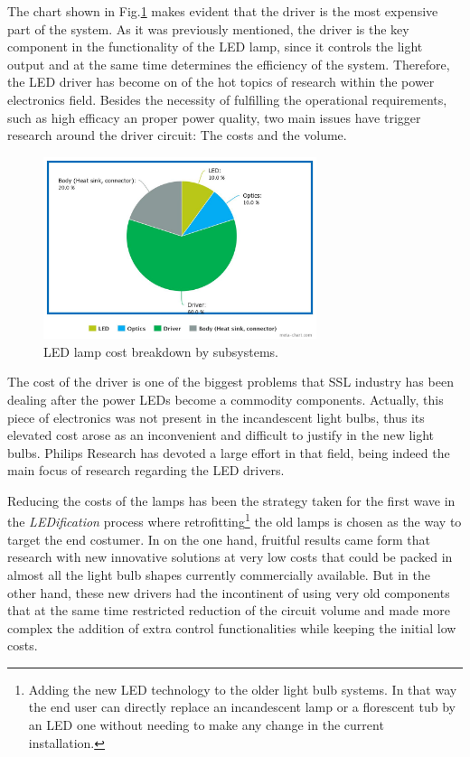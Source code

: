 \vspace{5mm} %

The chart shown in Fig.\ref{fig:cost_breakdown} makes evident that the driver is the most expensive part of the system. As it was previously mentioned, the driver is the key component in the functionality of the LED lamp, since it controls the light output and at the same time determines the efficiency of the system. Therefore, the LED driver has become on of the hot topics of research within the power electronics field. Besides the necessity of fulfilling the operational requirements, such as high efficacy an proper power quality, two main issues have trigger research around the driver circuit: The costs and the volume.
\begin{figure}[!h]
\centering
\includegraphics[width=8cm]{./0_intro/img/piechar_costs.jpeg}
\caption{LED lamp cost breakdown by subsystems.}
\label{fig:cost_breakdown}
\end{figure}

\vspace{5mm} %

The cost of the driver is one of the biggest problems that SSL industry has been dealing after the power LEDs become a commodity components. Actually, this piece of electronics was not present in the incandescent light bulbs, thus its elevated cost arose as an inconvenient and difficult to justify in the new light bulbs. Philips Research has devoted a large effort in that field, being indeed the main focus of research regarding the LED drivers.


Reducing the costs of the lamps has been the strategy taken for the first wave in the \emph{LEDification} process where retrofitting\footnote{Adding the new LED technology to the older light bulb systems. In that way the end user can directly replace an incandescent lamp or a florescent tub by an LED one without needing to make any change in the current installation.} the old lamps is chosen as the way to target the end costumer. In on the one hand, fruitful results came form that research with new innovative solutions at very low costs that could be packed in almost all the light bulb shapes currently commercially available. But in the other hand, these new drivers had the incontinent of using very old components that at the same time restricted reduction of the circuit volume and made more complex the addition of extra control functionalities while keeping the initial low costs.

